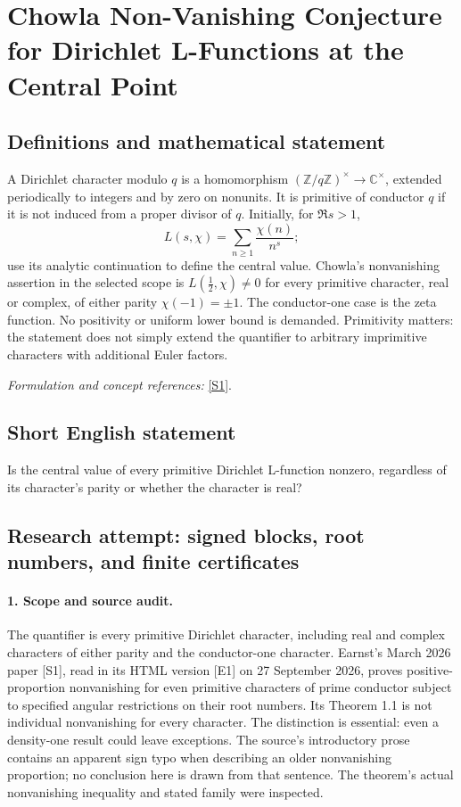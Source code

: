\documentclass[11pt]{article}
\begin{document}
\section*{\texorpdfstring{Chowla Non-Vanishing Conjecture for Dirichlet L-Functions at the Central Point}{Chowla Non-Vanishing Conjecture for Dirichlet L-Functions at the Central Point}}\label{statement}
\subsection{Definitions and mathematical statement}
A Dirichlet character modulo $q$ is a homomorphism $({\mathbb{Z}}/q{\mathbb{Z}})^\times\to{\mathbb{C}}^\times$, extended periodically to integers and by zero on nonunits. It is primitive of conductor $q$ if it is not induced from a proper divisor of $q$. Initially, for $\Re s>1$,
\[
 L(s,\chi)=\sum_{n\ge1}\frac{\chi(n)}{n^s};
\]
use its analytic continuation to define the central value. Chowla's nonvanishing assertion in the selected scope is $L(\tfrac12,\chi)\ne0$ for every primitive character, real or complex, of either parity $\chi(-1)=\pm1$. The conductor-one case is the zeta function. No positivity or uniform lower bound is demanded. Primitivity matters: the statement does not simply extend the quantifier to arbitrary imprimitive characters with additional Euler factors.
\par\smallskip\textit{Formulation and concept references:} \href{https://arxiv.org/pdf/2603.22124v1}{[S1]}.

\subsection{Short English statement}
Is the central value of every primitive Dirichlet L-function nonzero, regardless of its character's parity or whether the character is real?
\subsection{Research attempt: signed blocks, root numbers, and finite certificates}
\paragraph{1. Scope and source audit.}
The quantifier is every primitive Dirichlet character, including real and complex characters of either parity and the conductor-one character. Earnst's March 2026 paper [S1], read in its HTML version [E1] on 27 September 2026, proves positive-proportion nonvanishing for even primitive characters of prime conductor subject to specified angular restrictions on their root numbers. Its Theorem 1.1 is not individual nonvanishing for every character. The distinction is essential: even a density-one result could leave exceptions. The source's introductory prose contains an apparent sign typo when describing an older nonvanishing proportion; no conclusion here is drawn from that sentence. The theorem's actual nonvanishing inequality and stated family were inspected.
\end{document}
